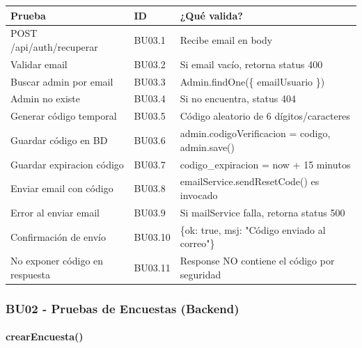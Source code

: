 \begin{table}[H]
\centering
\begin{tabular}{|l|l|p{6cm}|}
\hline
\textbf{Prueba} & \textbf{ID} & \textbf{¿Qué valida?} \\ \hline
POST /api/auth/recuperar & BU03.1 & Recibe email en body \\ \hline
Validar email & BU03.2 & Si email vacío, retorna status 400 \\ \hline
Buscar admin por email & BU03.3 & Admin.findOne(\{ emailUsuario \}) \\ \hline
Admin no existe & BU03.4 & Si no encuentra, status 404 \\ \hline
Generar código temporal & BU03.5 & Código aleatorio de 6 dígitos/caracteres \\ \hline
Guardar código en BD & BU03.6 & admin.codigoVerificacion = codigo, admin.save() \\ \hline
Guardar expiracion código & BU03.7 & codigo\_expiracion = now + 15 minutos \\ \hline
Enviar email con código & BU03.8 & emailService.sendResetCode() es invocado \\ \hline
Error al enviar email & BU03.9 & Si mailService falla, retorna status 500 \\ \hline
Confirmación de envío & BU03.10 & \{ok: true, msj: "Código enviado al correo"\} \\ \hline
No exponer código en respuesta & BU03.11 & Response NO contiene el código por seguridad \\ \hline
\end{tabular}
\end{table}

\subsubsection{BU02 - Pruebas de Encuestas (Backend)}

\paragraph{crearEncuesta()}

